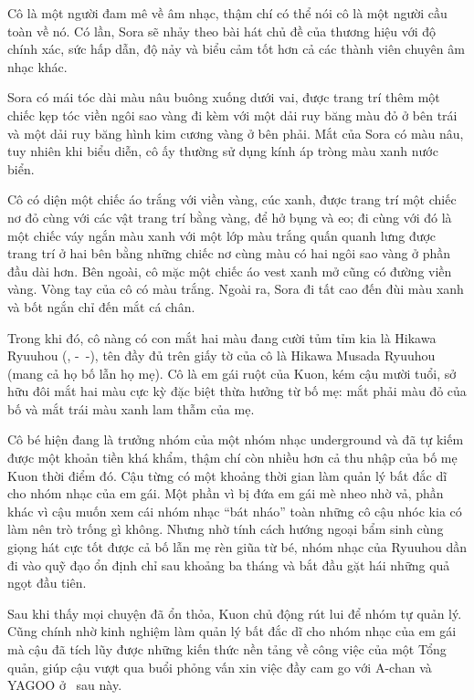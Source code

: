 \documentclass[../main.tex]{subfiles}
\begin{document}
Cô là một người đam mê về âm nhạc, thậm chí có thể nói cô là một người cầu toàn về nó. Có lần, Sora sẽ nhảy theo bài hát chủ đề của thương hiệu với độ chính xác, sức hấp dẫn, độ nảy và biểu cảm tốt hơn cả các thành viên chuyên âm nhạc khác.

Sora có mái tóc dài màu nâu buông xuống dưới vai, được trang trí thêm một chiếc kẹp tóc viền ngôi sao vàng đi kèm với một dải ruy băng màu đỏ ở bên trái và một dải ruy băng hình kim cương vàng ở bên phải. Mắt của Sora có màu nâu, tuy nhiên khi biểu diễn, cô ấy thường sử dụng kính áp tròng màu xanh nước biển.

Cô có diện một chiếc áo trắng với viền vàng, cúc xanh, được trang trí một chiếc nơ đỏ cùng với các vật trang trí bằng vàng, để hở bụng và eo; đi cùng với đó là một chiếc váy ngắn màu xanh với một lớp màu trắng quấn quanh lưng được trang trí ở hai bên bằng những chiếc nơ cùng màu có hai ngôi sao vàng ở phần đầu dài hơn. Bên ngoài, cô mặc một chiếc áo vest xanh mở cũng có đường viền vàng. Vòng tay của cô có màu trắng. Ngoài ra, Sora đi tất cao đến đùi màu xanh và bốt ngắn chỉ đến mắt cá chân.

Trong khi đó, cô nàng có con mắt hai màu đang cười tủm tỉm kia là Hikawa Ryuuhou (, -\ -), tên đầy đủ trên giấy tờ của cô là Hikawa Musada Ryuuhou (mang cả họ bố lẫn họ mẹ). Cô là em gái ruột của Kuon, kém cậu mười tuổi, sở hữu đôi mắt hai màu cực kỳ đặc biệt thừa hưởng từ bố mẹ: mắt phải màu đỏ của bố và mắt trái màu xanh lam thẫm của mẹ.

Cô bé hiện đang là trưởng nhóm của một nhóm nhạc underground và đã tự kiếm được một khoản tiền khá khẩm, thậm chí còn nhiều hơn cả thu nhập của bố mẹ Kuon thời điểm đó. Cậu từng có một khoảng thời gian làm quản lý bất đắc dĩ cho nhóm nhạc của em gái. Một phần vì bị đứa em gái mè nheo nhờ vả, phần khác vì cậu muốn xem cái nhóm nhạc ``bát nháo'' toàn những cô cậu nhóc kia có làm nên trò trống gì không. Nhưng nhờ tính cách hướng ngoại bẩm sinh cùng giọng hát cực tốt được cả bố lẫn mẹ rèn giũa từ bé, nhóm nhạc của Ryuuhou dần đi vào quỹ đạo ổn định chỉ sau khoảng ba tháng và bắt đầu gặt hái những quả ngọt đầu tiên.


Sau khi thấy mọi chuyện đã ổn thỏa, Kuon chủ động rút lui để nhóm tự quản lý. Cũng chính nhờ kinh nghiệm làm quản lý bất đắc dĩ cho nhóm nhạc của em gái mà cậu đã tích lũy được những kiến thức nền tảng về công việc của một Tổng quản, giúp cậu vượt qua buổi phỏng vấn xin việc đầy cam go với A-chan và YAGOO ở \hll\ sau này.
\end{document}
